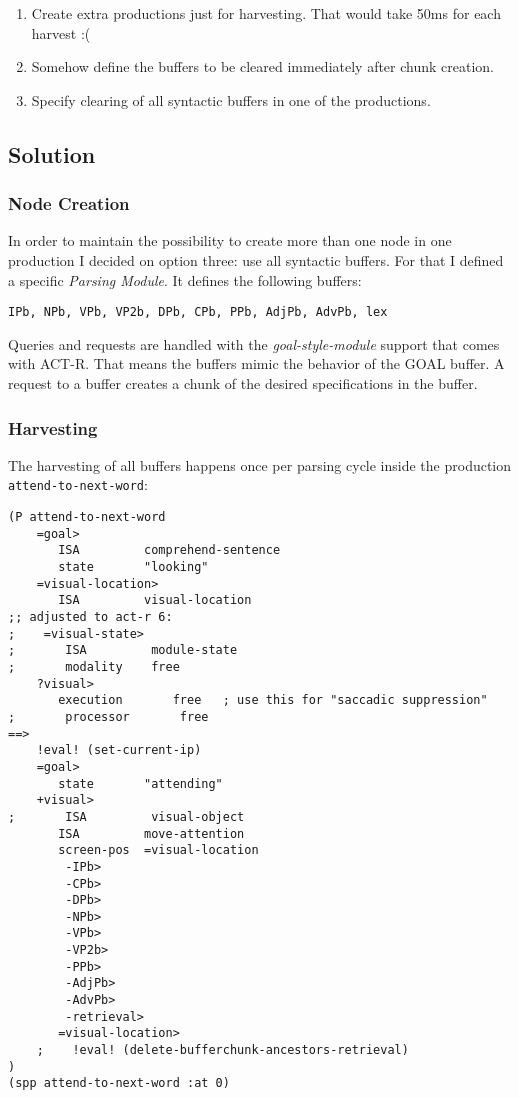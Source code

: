 \documentclass[nobf,fignum,doc,longtable]{apa}
\begin{document}
\begin{enumerate}
\item Create extra productions just for harvesting. That would take 50ms for each harvest :(
\item Somehow define the buffers to be cleared immediately after chunk creation.
\item Specify clearing of all syntactic buffers in one of the productions.
\end{enumerate}

\subsection{Solution}
\subsubsection{Node Creation}
In order to maintain the possibility to create more than one node in one production I decided on option three: use all syntactic buffers. For that I defined a specific \emph{Parsing Module}. It defines the following buffers: \\
\begin{verbatim}
IPb, NPb, VPb, VP2b, DPb, CPb, PPb, AdjPb, AdvPb, lex
\end{verbatim}
Queries and requests are handled with the \emph{goal-style-module} support that comes with ACT-R. That means the buffers mimic the behavior of the GOAL buffer. A request to a buffer creates a chunk of the desired specifications in the buffer.

\subsubsection{Harvesting}
The harvesting of all buffers happens once per parsing cycle inside the production \texttt{attend-to-next-word}:

{\scriptsize \begin{verbatim}
(P attend-to-next-word
    =goal>
       ISA         comprehend-sentence
       state       "looking"
    =visual-location>
       ISA         visual-location
;; adjusted to act-r 6:
;    =visual-state>
;       ISA         module-state
;       modality    free
    ?visual>
       execution       free   ; use this for "saccadic suppression"
;       processor       free
==>
    !eval! (set-current-ip)
    =goal>
       state       "attending"
    +visual>
;       ISA         visual-object
       ISA         move-attention
       screen-pos  =visual-location
        -IPb>
        -CPb>
        -DPb>
        -NPb>
        -VPb>
        -VP2b>
        -PPb>
        -AdjPb>
        -AdvPb>
        -retrieval>
       =visual-location>
    ;    !eval! (delete-bufferchunk-ancestors-retrieval)
)
(spp attend-to-next-word :at 0)
\end{verbatim}}
\end{document}
